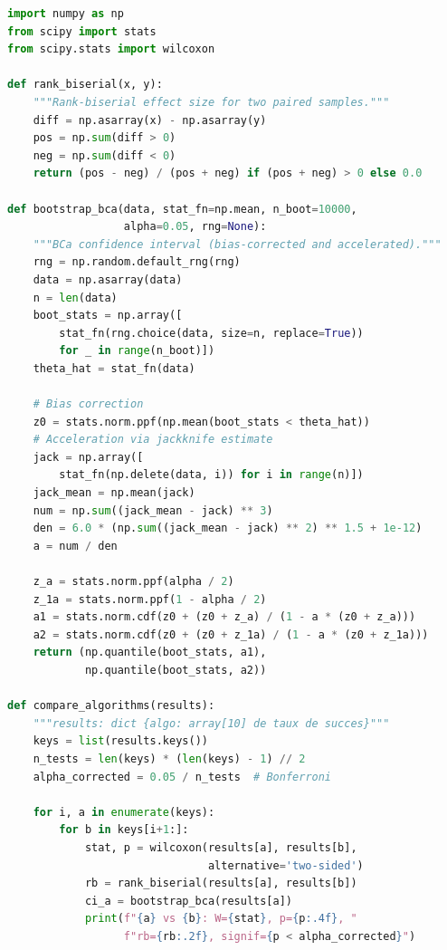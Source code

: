 \begin{lstlisting}[language=Python, caption={Inter-algorithm statistical analysis.}, label={lst:stats}]
import numpy as np
from scipy import stats
from scipy.stats import wilcoxon

def rank_biserial(x, y):
    """Rank-biserial effect size for two paired samples."""
    diff = np.asarray(x) - np.asarray(y)
    pos = np.sum(diff > 0)
    neg = np.sum(diff < 0)
    return (pos - neg) / (pos + neg) if (pos + neg) > 0 else 0.0

def bootstrap_bca(data, stat_fn=np.mean, n_boot=10000,
                  alpha=0.05, rng=None):
    """BCa confidence interval (bias-corrected and accelerated)."""
    rng = np.random.default_rng(rng)
    data = np.asarray(data)
    n = len(data)
    boot_stats = np.array([
        stat_fn(rng.choice(data, size=n, replace=True))
        for _ in range(n_boot)])
    theta_hat = stat_fn(data)

    # Bias correction
    z0 = stats.norm.ppf(np.mean(boot_stats < theta_hat))
    # Acceleration via jackknife estimate
    jack = np.array([
        stat_fn(np.delete(data, i)) for i in range(n)])
    jack_mean = np.mean(jack)
    num = np.sum((jack_mean - jack) ** 3)
    den = 6.0 * (np.sum((jack_mean - jack) ** 2) ** 1.5 + 1e-12)
    a = num / den

    z_a = stats.norm.ppf(alpha / 2)
    z_1a = stats.norm.ppf(1 - alpha / 2)
    a1 = stats.norm.cdf(z0 + (z0 + z_a) / (1 - a * (z0 + z_a)))
    a2 = stats.norm.cdf(z0 + (z0 + z_1a) / (1 - a * (z0 + z_1a)))
    return (np.quantile(boot_stats, a1),
            np.quantile(boot_stats, a2))

def compare_algorithms(results):
    """results: dict {algo: array[10] de taux de succes}"""
    keys = list(results.keys())
    n_tests = len(keys) * (len(keys) - 1) // 2
    alpha_corrected = 0.05 / n_tests  # Bonferroni

    for i, a in enumerate(keys):
        for b in keys[i+1:]:
            stat, p = wilcoxon(results[a], results[b],
                               alternative='two-sided')
            rb = rank_biserial(results[a], results[b])
            ci_a = bootstrap_bca(results[a])
            print(f"{a} vs {b}: W={stat}, p={p:.4f}, "
                  f"rb={rb:.2f}, signif={p < alpha_corrected}")
\end{lstlisting}

\clearpage
\thispagestyle{empty}
\vspace*{\fill}

